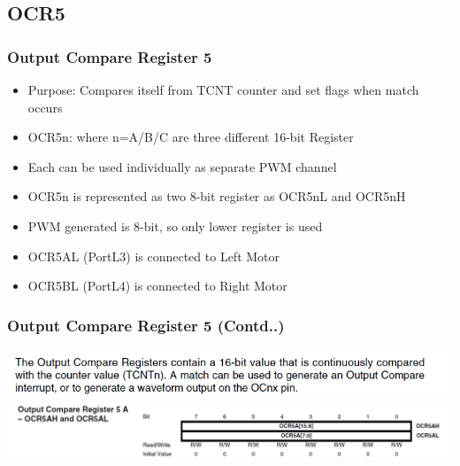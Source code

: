 \documentclass[10pt,red]{beamer}
\begin{document}
\subsection{OCR5}
\begin{frame}
		\frametitle{Output Compare Register 5} \pause
			\begin{itemize}
				\item<+-|alert@+> Purpose: Compares itself from TCNT counter and set flags when match occurs \\[10pt]
				\item<+-|alert@+> OCR5n: where n=A/B/C are three different 16-bit Register  \\[10pt]
				\item<+-|alert@+> Each can be used individually as separate PWM channel \\[10pt]
				\item<+-|alert@+> OCR5n is represented as two 8-bit register as OCR5nL and OCR5nH \\[10pt]
				\item<+-|alert@+> PWM generated is 8-bit, so only lower register is used \\[10pt]
				\item<+-|alert@+> OCR5AL (PortL3) is connected to Left Motor  \\[10pt]
				\item<+-|alert@+> OCR5BL (PortL4) is connected to Right Motor \\[10pt]
			\end{itemize}
\end{frame}	

\begin{frame}
		\frametitle{Output Compare Register 5 (Contd..)} \pause
			\includegraphics[width = \linewidth]{ocr5_1} \pause \\[20pt]
			\includegraphics[width = \linewidth]{ocr5_2}  \\[10pt]
\end{frame}
\end{document}
